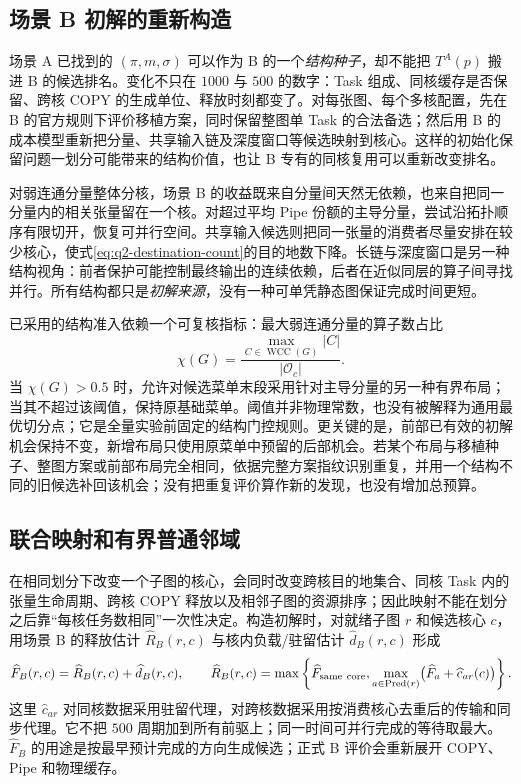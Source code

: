 \subsection{场景 B 初解的重新构造}
场景 A 已找到的 $(\pi,m,\sigma)$ 可以作为 B 的一个\emph{结构种子}，却不能把 $T^A(p)$ 搬进 B 的候选排名。变化不只在 $1000$ 与 $500$ 的数字：Task 组成、同核缓存是否保留、跨核 COPY 的生成单位、释放时刻都变了。对每张图、每个多核配置，先在 B 的官方规则下评价移植方案，同时保留整图单 Task 的合法备选；然后用 B 的成本模型重新把分量、共享输入链及深度窗口等候选映射到核心。这样的初始化保留问题一划分可能带来的结构价值，也让 B 专有的同核复用可以重新改变排名。

对弱连通分量整体分核，场景 B 的收益既来自分量间天然无依赖，也来自把同一分量内的相关张量留在一个核。对超过平均 Pipe 份额的主导分量，尝试沿拓扑顺序有限切开，恢复可并行空间。共享输入候选则把同一张量的消费者尽量安排在较少核心，使式\eqref{eq:q2-destination-count}的目的地数下降。长链与深度窗口是另一种结构视角：前者保护可能控制最终输出的连续依赖，后者在近似同层的算子间寻找并行。所有结构都只是\emph{初解来源}，没有一种可单凭静态图保证完成时间更短。

已采用的结构准入依赖一个可复核指标：最大弱连通分量的算子数占比
\begin{equation}\label{eq:q2-dominant-ratio}
\chi(G)=\frac{\max_{C\in\operatorname{WCC}(G)}|C|}{|\mathcal O_c|}.
\end{equation}
当 $\chi(G)>0.5$ 时，允许对候选菜单末段采用针对主导分量的另一种有界布局；当其不超过该阈值，保持原基础菜单。阈值并非物理常数，也没有被解释为通用最优切分点；它是全量实验前固定的结构门控规则。更关键的是，前部已有效的初解机会保持不变，新增布局只使用原菜单中预留的后部机会。若某个布局与移植种子、整图方案或前部布局完全相同，依据完整方案指纹识别重复，并用一个结构不同的旧候选补回该机会；没有把重复评价算作新的发现，也没有增加总预算。

\subsection{联合映射和有界普通邻域}
在相同划分下改变一个子图的核心，会同时改变跨核目的地集合、同核 Task 内的张量生命周期、跨核 COPY 释放以及相邻子图的资源排序；因此映射不能在划分之后靠“每核任务数相同”一次性决定。构造初解时，对就绪子图 $r$ 和候选核心 $c$，用场景 B 的释放估计 $\widehat R_B(r,c)$ 与核内负载/驻留估计 $\widehat d_B(r,c)$ 形成
\begin{equation}\label{eq:q2-eft}
\widehat F_B(r,c)=\widehat R_B(r,c)+\widehat d_B(r,c),
\qquad
\widehat R_B(r,c)=
\max\left\{\widehat F_{\rm same\ core},
\max_{a\in\operatorname{Pred}(r)}
\bigl(\widehat F_a+\widehat c_{ar}(c)\bigr)\right\}.
\end{equation}
这里 $\widehat c_{ar}$ 对同核数据采用驻留代理，对跨核数据采用按消费核心去重后的传输和同步代理。它不把 $500$ 周期加到所有前驱上；同一时间可并行完成的等待取最大。$\widehat F_B$ 的用途是按最早预计完成的方向生成候选；正式 B 评价会重新展开 COPY、Pipe 和物理缓存。

